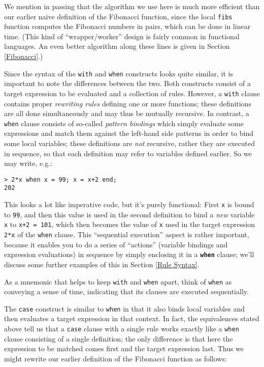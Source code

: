 \documentclass[a4paper,12pt]{article}
\newcommand{\kw}[1]{\texttt{\textbf{#1}}}
\begin{document}
We mention in passing that the algorithm we use here is much more efficient than our earlier naive definition of the Fibonacci function, since the local \verb|fibs| function computes the Fibonacci numbers in pairs, which can be done in linear time. (This kind of ``wrapper/worker'' design is fairly common in functional languages. An even better algorithm along these lines is given in Section \ref{Fibonacci}.)

Since the syntax of the \lstinline{with} and \lstinline{when} constructs looks quite similar, it is important to note the differences between the two. Both constructs consist of a target expression to be evaluated and a collection of rules. However, a \lstinline{with} clause contains proper \emph{rewriting rules} defining one or more functions; these definitions are all done simultaneously and may thus be mutually recursive. In contrast, a \lstinline{when} clause consists of so-called \emph{pattern bindings} which simply evaluate some expressions and match them against the left-hand side patterns in order to bind some local variables; these definitions are \emph{not} recursive, rather they are executed in sequence, so that each definition may refer to variables defined earlier. So we may write, e.g.:

\begin{lstlisting}
> 2*x when x = 99; x = x+2 end;
202
\end{lstlisting}

This looks a lot like imperative code, but it's purely functional: First \verb|x| is bound to \verb|99|, and then this value is used in the second definition to bind a \emph{new} variable \verb|x| to \lstinline{x+2 = 101}, which then becomes the value of \verb|x| used in the target expression \verb|2*x| of the \lstinline{when} clause. This ``sequential execution'' aspect is rather important, because it enables you to do a series of ``actions'' (variable bindings and expression evaluations) in sequence by simply enclosing it in a \kw{when} clause; we'll discuss some further examples of this in Section \ref{Rule Syntax}.

As a mnemonic that helps to keep \lstinline{with} and \lstinline{when} apart, think of \lstinline{when} as conveying a sense of time, indicating that its clauses are executed sequentially.

The \lstinline{case} construct is similar to \lstinline{when} in that it also binds local variables and then evaluates a target expression in that context. In fact, the equivalences stated above tell us that a \lstinline{case} clause with a single rule works exactly like a \lstinline{when} clause consisting of a single definition; the only difference is that here the expression to be matched comes first and the target expression last. Thus we might rewrite our earlier definition of the Fibonacci function as follows:
\end{document}
